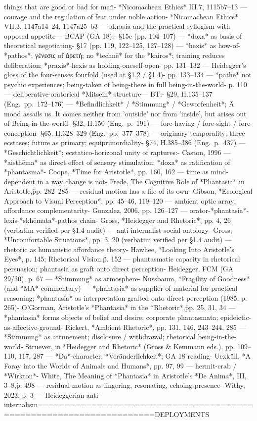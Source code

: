 {things that are good or bad for man\"\n- *Nicomachean Ethics* III.7, 1115b7–13 — courage and the regulation of fear under noble action\n- *Nicomachean Ethics* VII.3, 1147a14–24, 1147a25–b3 — akrasia and the practical syllogism with opposed appetite\n\nHEIDEGGER — BCAP (GA 18):\n- §15e (pp. 104–107) — *doxa* as basis of theoretical negotiating\n- §17 (pp. 119, 122–125, 127–128) — *hexis* as how-of-*pathos*; γένεσις of ἀρετή; no *technē* for the *kairos*; training reduces deliberation; *praxis*-hexis as holding-oneself-open\n- pp. 131–132 — Heidegger's gloss of the four-senses fourfold (used at §1.2 / §1.4)\n- pp. 133–134 — *pathē* not psychic experiences; being-taken of being-there in full being-in-the-world\n- p. 110 — deliberative-oratorical *Mitsein* structure\n\nHEIDEGGER — BT:\n- §29, H.135–137 (Eng.~pp.~172–176) — *Befindlichkeit* / *Stimmung* / *Geworfenheit*; \"A mood assails us. It comes neither from 'outside' nor from 'inside', but arises out of Being-in-the-world\"\n- §32, H.150 (Eng.~p.~191) — fore-having / fore-sight / fore-conception\n- §65, H.328–329 (Eng.~pp.~377–378) — originary temporality; three ecstases; future as primary; equiprimordiality\n- §74, H.385–386 (Eng.~p.~437) — *Geschichtlichkeit*; ecstatico-horizonal unity of raptures\n\nSECONDARY:\n- Caston, 1996 — *aisthēma* as direct effect of sensory stimulation; *doxa* as ratification of *phantasma*\n- Coope, *Time for Aristotle*, pp. 160, 162 — time as mind-dependent in a way change is not\n- Frede, \"The Cognitive Role of *Phantasia* in Aristotle,\" pp. 282–285 — residual motion has a life of its own\n- Gibson, *Ecological Approach to Visual Perception*, pp. 45–46, 119–120 — ambient optic array; affordance complementarity\n- Gonzalez, 2006, pp. 126–127 — orator-*phantasia*-lexis-*skhēmata*-pathos chain\n- Gross, *Heidegger and Rhetoric*, pp. 4, 26 (verbatim verified per §1.4 audit) — anti-internalist social-ontology\n- Gross, *Uncomfortable Situations*, pp. 3, 20 (verbatim verified per §1.4 audit) — rhetoric as humanistic affordance theory\n- Hawhee, *Looking Into Aristotle's Eyes*, p. 145; \"Rhetorical Vision,\" p. 152 — phantasmatic capacity in rhetorical persuasion; phantasia as graft onto direct perception\n- Heidegger, FCM (GA 29/30), p. 67 — *Stimmung* as atmosphere\n- Nussbaum, *Fragility of Goodness* (and *MA* commentary) — *phantasia* as supplier of material for practical reasoning; *phantasia* as interpretation grafted onto direct perception (1985, p. 265)\n- O'Gorman, \"Aristotle's *Phantasia* in the *Rhetoric*,\" pp. 25, 31, 34 — *phantasia* forms objects of belief and desire; corporate phantasmata; epideictic-as-affective-ground\n- Rickert, *Ambient Rhetoric*, pp. 131, 146, 243–244, 285 — *Stimmung* as attunement; disclosure / withdrawal; rhetorical being-in-the-world\n- Struever, in *Heidegger and Rhetoric* (Gross & Kemmann eds.), pp. 109–110, 117, 287 — *Da*-character; *Veränderlichkeit*; GA 18 reading\n- Uexküll, *A Foray into the Worlds of Animals and Humans*, pp. 97, 99 — hermit-crab / *Wirkton*\n- White, \"The Meaning of *Phantasia* in Aristotle's *De Anima*, III, 3–8,\" p. 498 — residual motion as lingering, resonating, echoing presence\n- Withy, 2023, p. 3 — Heideggerian anti-internalism\n\n====================================================================\nFORBIDDEN DEPLOYMENTS }

